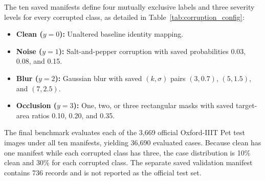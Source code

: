 \documentclass[journal,compsoc]{IEEEtran}
\begin{document}
\begin{table}[!b]
\caption{Official Test Manifest Configuration for Tasks 1--3 (3,669 Records per Row)}
\label{tab:corruption_config}
\centering
{}
\end{table}

The ten saved manifests define four mutually exclusive labels and three severity levels for every corrupted class, as detailed in Table~\ref{tab:corruption_config}:
\begin{itemize}
    \item \textbf{Clean ($y=0$):} Unaltered baseline identity mapping.
    \item \textbf{Noise ($y=1$):} Salt-and-pepper corruption with saved probabilities 0.03, 0.08, and 0.15.
    \item \textbf{Blur ($y=2$):} Gaussian blur with saved $(k,\sigma)$ pairs $(3,0.7)$, $(5,1.5)$, and $(7,2.5)$.
    \item \textbf{Occlusion ($y=3$):} One, two, or three rectangular masks with saved target-area ratios 0.10, 0.20, and 0.35.
\end{itemize}

The final benchmark evaluates each of the 3,669 official Oxford-IIIT Pet test images under all ten manifests, yielding 36,690 evaluated cases. Because clean has one manifest while each corrupted class has three, the case distribution is 10\% clean and 30\% for each corrupted class. The separate saved validation manifest contains 736 records and is not reported as the official test set.
\end{document}
